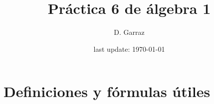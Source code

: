 \documentclass[12pt,a4paper, spanish]{article}
\begin{document}

\pagestyle{empty} %

\title{Práctica 6 de álgebra 1} %
\author{D. Garraz} %
\date{last update: \today} %

\maketitle  %

\section{Definiciones y fórmulas útiles}
\end{document}
